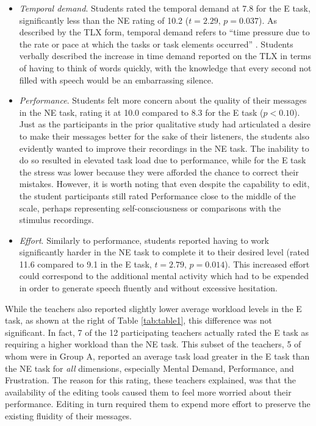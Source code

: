 \begin{itemize}
	\item \emph{Temporal demand}. Students rated the temporal demand at 7.8 for the E task, significantly less than the NE rating of 10.2 ($t=2.29,\,p=0.037$). 
	As described by the TLX form, temporal demand refers to ``time pressure due to the rate or pace at which the tasks or task elements occurred'' \cite{nasatlx}.
	Students verbally described the increase in time demand reported on the TLX in terms of having to think of words quickly, with the knowledge that every second not filled with speech would be an embarrassing silence.
	\item \emph{Performance}. Students felt more concern about the quality of their messages in the NE task, rating it at 10.0 compared to 8.3 for the E task ($p<0.10$). 
	Just as the participants in the prior qualitative study had articulated a desire to make their messages better for the sake of their listeners, the students also evidently wanted to improve their recordings in the NE task. 
	The inability to do so resulted in elevated task load due to performance, while for the E task the stress was lower because they were afforded the chance to correct their mistakes.
	However, it is worth noting that even despite the capability to edit, the student participants still rated Performance close to the middle of the scale, perhaps representing self-consciousness or comparisons with the stimulus recordings.
	\item \emph{Effort}. Similarly to performance, students reported having to work significantly harder in the NE task to complete it to their desired level (rated 11.6 compared to 9.1 in the E task, $t=2.79,\,p=0.014$). 
	This increased effort could correspond to the additional mental activity which had to be expended in order to generate speech fluently and without excessive hesitation.
\end{itemize}

While the teachers also reported slightly lower average workload levels in the E task, as shown at the right of Table \ref{tab:table1}, this difference was not significant.
In fact, 7 of the 12 participating teachers actually rated the E task as requiring a higher workload than the NE task.
This subset of the teachers, 5 of whom were in Group A, reported an average task load greater in the E task than the NE task for \emph{all} dimensions, especially Mental Demand, Performance, and Frustration.
The reason for this rating, these teachers explained, was that the availability of the editing tools caused them to feel more worried about their performance.
Editing in turn required them to expend more effort to preserve the existing fluidity of their messages.

